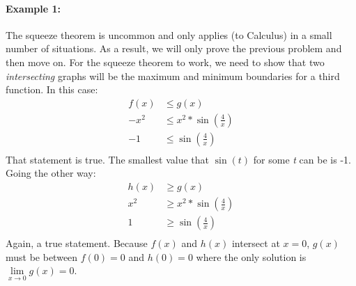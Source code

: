 \documentclass[../revisedMain.tex]{subfiles}
\begin{document}
\paragraph{Example 1:} The squeeze theorem is uncommon and only applies (to Calculus) in a small number of situations. As a result, we will only prove the previous problem and then move on. For the squeeze theorem to work, we need to show that two \textit{intersecting} graphs will be the maximum and minimum boundaries for a third function. In this case:
\begin{equation}
	\begin{split}
	f(x)&\le g(x)\\ 
	-x^2&\le x^2*\sin\left(\frac{4}{x}\right)\\
	-1&\le\sin\left(\frac{4}{x}\right)\\
	\end{split}
\end{equation}
That statement is true. The smallest value that \(\sin(t)\) for some \textit{t} can be is -1. Going the other way:
 \begin{equation}
 \begin{split}
 h(x)&\ge g(x)\\ 
 x^2&\ge x^2*\sin\left(\frac{4}{x}\right)\\
 1&\ge\sin\left(\frac{4}{x}\right)\\
 \end{split}
 \end{equation}
Again, a true statement. Because \(f(x)\) and \(h(x)\) intersect at \(x=0\), \(g(x)\) must be between \(f(0)=0\) and \(h(0)=0\) where the only solution is \(\lim\limits_{x\to 0}g(x)=0\).\\
\end{document}
